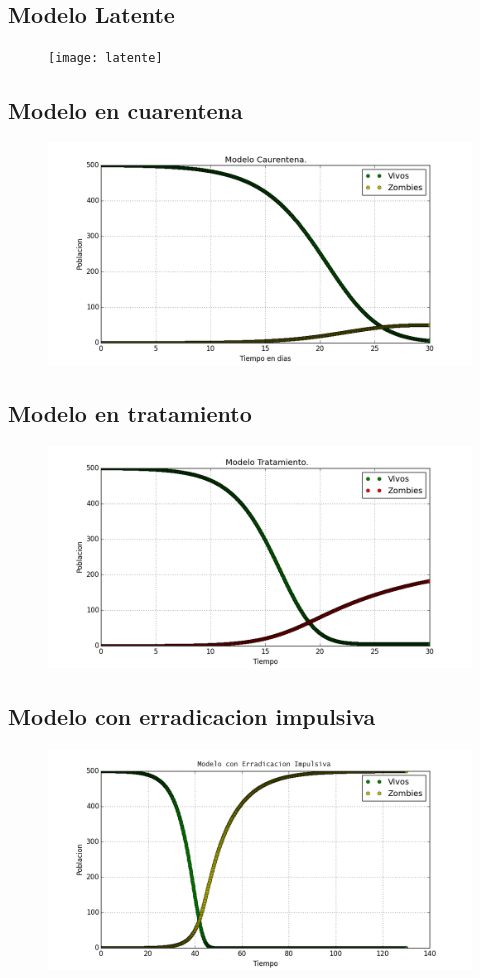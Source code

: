 \documentclass[12pt]{article}
\begin{document}
\subsection{Modelo Latente}
\begin{figure}[H]
\texttt{[image: latente]}
\end{figure}\subsection{Modelo en cuarentena}
\begin{figure}[H]
\includegraphics[scale=.6]{cuarentena}
\end{figure}\subsection{Modelo en tratamiento}
\begin{figure}[H]
\includegraphics[scale=.6]{tratamiento}
\end{figure}\subsection{Modelo con erradicacion impulsiva}
\begin{figure}[H]
\includegraphics[scale=.6]{erradicacion}
\end{figure}
\end{document}

